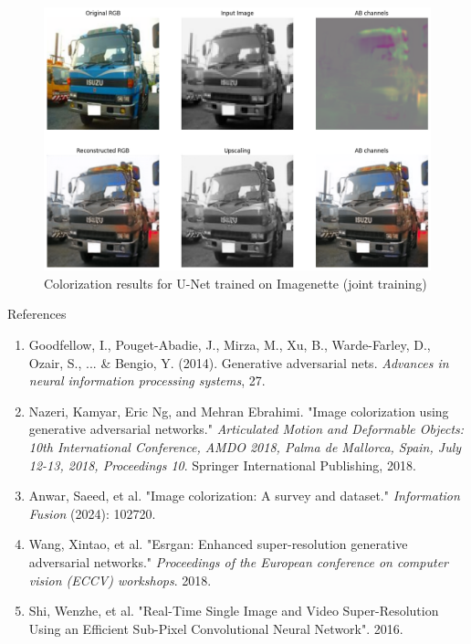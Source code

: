 \documentclass[aspectratio=169]{beamer}
\theoremstyle{definition}
\begin{document}
\begin{frame}
    \begin{figure}
        \centering
        \includegraphics[width=.75\textwidth]{demo-both/truc.png}
        \caption{Colorization results for U-Net trained on Imagenette (joint training)}
    \end{figure}
\end{frame}

\begin{frame}{References}
    \begin{enumerate}
        \item Goodfellow, I., Pouget-Abadie, J., Mirza, M., Xu, B., Warde-Farley, D., Ozair, S., ... \& Bengio, Y. (2014). Generative adversarial nets. \emph{Advances in neural information processing systems}, 27.
        \item Nazeri, Kamyar, Eric Ng, and Mehran Ebrahimi. "Image colorization using generative adversarial networks." \emph{Articulated Motion and Deformable Objects: 10th International Conference, AMDO 2018, Palma de Mallorca, Spain, July 12-13, 2018, Proceedings 10}. Springer International Publishing, 2018.
        \item Anwar, Saeed, et al. "Image colorization: A survey and dataset." \emph{Information Fusion} (2024): 102720.
        \item Wang, Xintao, et al. "Esrgan: Enhanced super-resolution generative adversarial networks." \emph{Proceedings of the European conference on computer vision (ECCV) workshops}. 2018.
        \item Shi, Wenzhe, et al. "Real-Time Single Image and Video Super-Resolution Using an Efficient Sub-Pixel Convolutional Neural Network". 2016.
    \end{enumerate}
\end{frame}
\end{document}
